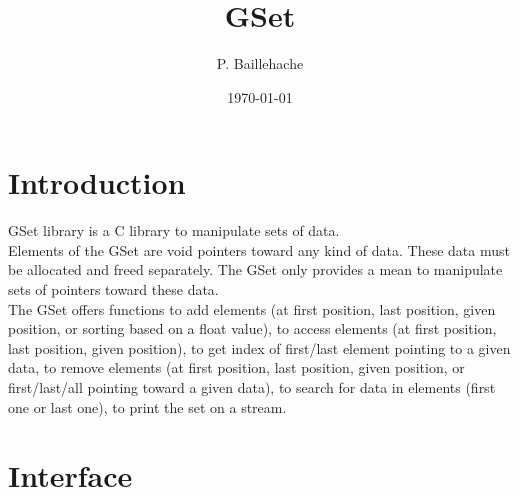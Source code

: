 \documentclass[12pt, a4paper]{article}
\begin{document}
\title{GSet}
\author{P. Baillehache}
\date{\today}
\maketitle

\tableofcontents

\section*{Introduction}

GSet library is a C library to manipulate sets of data.\\

Elements of the GSet are void pointers toward any kind of data. These data must be allocated and freed separately. The GSet only provides a mean to manipulate sets of pointers toward these data.\\

The GSet offers functions to add elements (at first position, last position, given position, or sorting based on a float value), to access elements (at first position, last position, given position), to get index of first/last element pointing to a given data, to remove elements (at first position, last position, given position, or first/last/all pointing toward a given data), to search for data in elements (first one or last one), to print the set on a stream.\\ 

\section{Interface}
\end{document}
